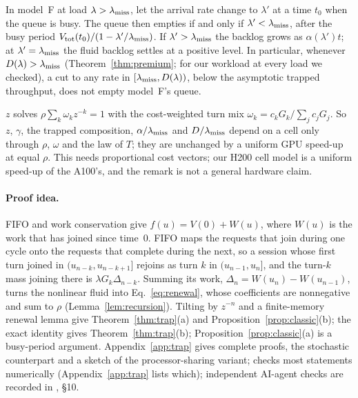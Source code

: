 \begin{corollary}\label{cor:trapthr}
In model~F at load $\lambda>\lambda_{\mathrm{miss}}$, let the arrival rate change to $\lambda'$ at a time $t_0$ when the queue is busy. The
queue then empties if and only if $\lambda'<\lambda_{\mathrm{miss}}$, after the busy period $V_{\mathrm{tot}}(t_0)/(1-\lambda'/\lambda_{\mathrm{miss}})$. If
$\lambda'>\lambda_{\mathrm{miss}}$ the backlog grows as $\alpha(\lambda')t$; at $\lambda'=\lambda_{\mathrm{miss}}$ the fluid backlog settles at a positive
level. In particular, whenever $D(\lambda)>\lambda_{\mathrm{miss}}$ (Theorem~\ref{thm:premium}; for our workload at every load we checked), a
cut to any rate in $[\lambda_{\mathrm{miss}},D(\lambda))$, below the asymptotic trapped throughput, does not empty model~F's queue.
\end{corollary}

\begin{nremark}[invariance]\label{rem:trapinv}
$z$ solves $\rho\sum_k\omega_kz^{-k}=1$ with the cost-weighted turn mix $\omega_k=c_kG_k/\sum_jc_jG_j$. So $z$, $\gamma$, the
trapped composition, $\alpha/\lambda_{\mathrm{miss}}$ and $D/\lambda_{\mathrm{miss}}$ depend on a cell only through $\rho$, $\omega$ and the law of $T$; they are
unchanged by a uniform GPU speed-up at equal $\rho$. This needs proportional cost vectors; our H200 cell model is a uniform speed-up
of the A100's, and the remark is not a general hardware claim.
\end{nremark}

\paragraph{Proof idea.} FIFO and work conservation give $f(u)=V(0)+W(u)$, where $W(u)$ is the work that has joined since
time~0. FIFO maps the requests that join during one cycle onto the requests that complete during the next, so a session
whose first turn joined in $(u_{n-k},u_{n-k+1}]$ rejoins as turn $k$ in $(u_{n-1},u_n]$, and the turn-$k$ mass joining there
is $\lambda G_k\Delta_{n-k}$. Summing its work, $\Delta_n=W(u_n)-W(u_{n-1})$, turns the nonlinear fluid into
Eq.~\eqref{eq:renewal}, whose coefficients are nonnegative and sum to $\rho$ (Lemma~\ref{lem:recursion}). Tilting by $z^{-n}$ and a
finite-memory renewal lemma give Theorem~\ref{thm:trap}(a) and Proposition~\ref{prop:classic}(b); the exact identity gives
Theorem~\ref{thm:trap}(b); Proposition~\ref{prop:classic}(a) is a busy-period argument. Appendix~\ref{app:trap} gives complete
proofs, the stochastic counterpart and a sketch of the processor-sharing variant;  checks most
statements numerically (Appendix~\ref{app:trap} lists which); independent AI-agent checks are recorded in , \S10.


